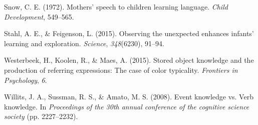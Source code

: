 \documentclass[10pt, letterpaper]{article}
\begin{document}
\leavevmode\hypertarget{ref-snow1972}{}%
Snow, C. E. (1972). Mothers' speech to children learning language.
\emph{Child Development}, 549--565.

\leavevmode\hypertarget{ref-stahl2015}{}%
Stahl, A. E., \& Feigenson, L. (2015). Observing the unexpected enhances
infants' learning and exploration. \emph{Science}, \emph{348}(6230),
91--94.

\leavevmode\hypertarget{ref-westerbeek2015}{}%
Westerbeek, H., Koolen, R., \& Maes, A. (2015). Stored object knowledge
and the production of referring expressions: The case of color
typicality. \emph{Frontiers in Psychology}, \emph{6}.

\leavevmode\hypertarget{ref-willits2008}{}%
Willits, J. A., Sussman, R. S., \& Amato, M. S. (2008). Event knowledge
vs. Verb knowledge. In \emph{Proceedings of the 30th annual conference
of the cognitive science society} (pp. 2227--2232).


\end{document}
